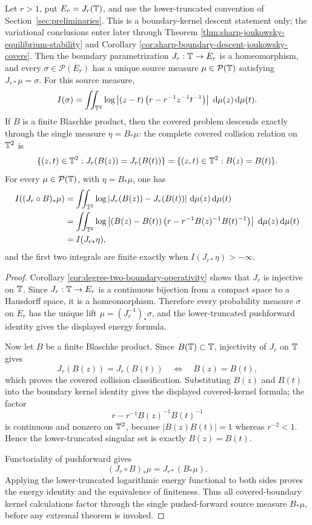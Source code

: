 \begin{theorem}\label{thm:exact-boundary-descent-joukowsky-covers}
Let \(r>1\), put \(E_r=J_r(\mathbb{T})\), and use the lower-truncated convention of Section~\ref{sec:preliminaries}.  This is a boundary-kernel descent statement only; the variational conclusions enter later through Theorem \ref{thm:sharp-joukowsky-equilibrium-stability} and Corollary \ref{cor:sharp-boundary-descent-joukowsky-covers}.  Then the boundary parametrization \(J_r:\mathbb{T}\to E_r\) is a homeomorphism, and every \(\sigma\in\mathcal P(E_r)\) has a unique source measure \(\mu\in\mathcal P(\mathbb{T})\) satisfying \(J_{r\ast}\mu=\sigma\).  For this source measure,
\[
I(\sigma)=\iint_{\mathbb{T}^2}\log\left|(z-t)\left(r-r^{-1}z^{-1}t^{-1}\right)\right|\,\,\mathrm{d}\mu(z)\,\mathrm{d}\mu(t).
\]
If \(B\) is a finite Blaschke product, then the covered problem descends exactly through the single measure \(\eta=B_\ast\mu\): the complete covered collision relation on \(\mathbb{T}^2\) is
\[
\{(z,t)\in\mathbb{T}^2:J_r(B(z))=J_r(B(t))\}
=
\{(z,t)\in\mathbb{T}^2:B(z)=B(t)\}.
\]
For every \(\mu\in\mathcal P(\mathbb{T})\), with \(\eta=B_\ast\mu\), one has
\[
\begin{aligned}
I((J_r\circ B)_\ast\mu)
&=\iint_{\mathbb{T}^2}\log|J_r(B(z))-J_r(B(t))|\,\,\mathrm{d}\mu(z)\,\mathrm{d}\mu(t)\\
&=\iint_{\mathbb{T}^2}\log\left|(B(z)-B(t))
\left(r-r^{-1}B(z)^{-1}B(t)^{-1}\right)\right|\,\,\mathrm{d}\mu(z)\,\mathrm{d}\mu(t)\\
&=I(J_{r\ast}\eta),
\end{aligned}
\]
and the first two integrals are finite exactly when \(I(J_{r\ast}\eta)>-\infty\).
\end{theorem}

\begin{proof}
Corollary \ref{cor:degree-two-boundary-operativity} shows that \(J_r\) is injective on \(\mathbb{T}\).  Since \(J_r:\mathbb{T}\to E_r\) is a continuous bijection from a compact space to a Hausdorff space, it is a homeomorphism.  Therefore every probability measure \(\sigma\) on \(E_r\) has the unique lift \(\mu=(J_r^{-1})_\ast\sigma\), and the lower-truncated pushforward identity gives the displayed energy formula.

Now let \(B\) be a finite Blaschke product.  Since \(B(\mathbb{T})\subset\mathbb{T}\), injectivity of \(J_r\) on \(\mathbb{T}\) gives
\[
J_r(B(z))=J_r(B(t))
\quad\Longleftrightarrow\quad
B(z)=B(t),
\]
which proves the covered collision classification.  Substituting \(B(z)\) and \(B(t)\) into the boundary kernel identity gives the displayed covered-kernel formula; the factor
\[
r-r^{-1}B(z)^{-1}B(t)^{-1}
\]
is continuous and nonzero on \(\mathbb{T}^2\), because \(|B(z)B(t)|=1\) whereas \(r^{-2}<1\).  Hence the lower-truncated singular set is exactly \(B(z)=B(t)\).

Functoriality of pushforward gives
\[
(J_r\circ B)_\ast\mu=J_{r\ast}(B_\ast\mu).
\]
Applying the lower-truncated logarithmic energy functional to both sides proves the energy identity and the equivalence of finiteness.  Thus all covered-boundary kernel calculations factor through the single pushed-forward source measure \(B_\ast\mu\), before any extremal theorem is invoked.
\end{proof}

